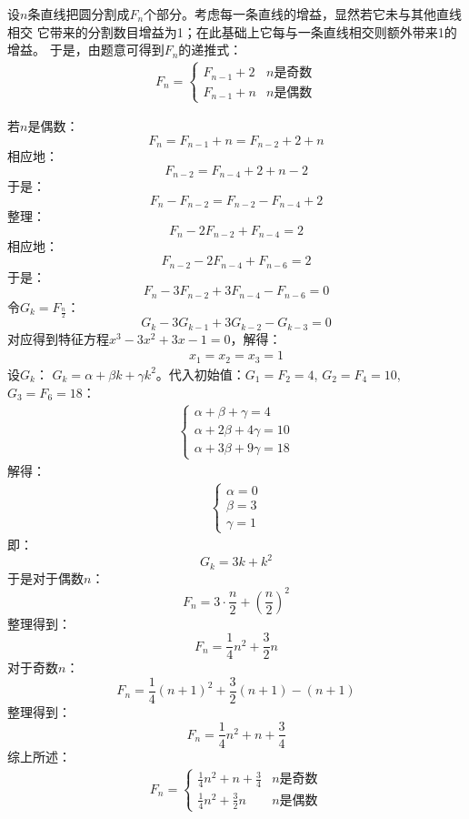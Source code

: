 \begin{solution}
    设$n$条直线把圆分割成$F_n$个部分。考虑每一条直线的增益，显然若它未与其他直线相交
    它带来的分割数目增益为1；在此基础上它每与一条直线相交则额外带来1的增益。
    于是，由题意可得到$F_n$的递推式：
    \begin{align*}
        F_n = 
        \begin{cases}
        F_{n-1}+2&n\text{是奇数}\\
        F_{n-1}+n&n\text{是偶数}
        \end{cases}
    \end{align*}

    若$n$是偶数：
    $$F_n=F_{n-1}+n=F_{n-2}+2+n$$
    相应地：
    $$F_{n-2}=F_{n-4}+2+n-2$$
    于是：
    $$F_n-F_{n-2}=F_{n-2}-F_{n-4}+2$$
    整理：
    $$F_n-2F_{n-2}+F_{n-4}=2$$
    相应地：
    $$F_{n-2}-2F_{n-4}+F_{n-6}=2$$
    于是：
    $$F_n-3F_{n-2}+3F_{n-4}-F_{n-6}=0$$
    令$G_k=F_\frac{n}{2}$：
    $$G_k-3G_{k-1}+3G_{k-2}-G_{k-3}=0$$
    对应得到特征方程$x^3-3x^2+3x-1=0$，解得：
    \begin{align*}
            x_1 = x_2 = x_3 = 1
    \end{align*}
    设$G_k$：
    $G_k = \alpha+ \beta k+\gamma k^2$。代入初始值：$G_1=F_2=4$,
    $G_2=F_4=10$, $G_3=F_6=18$：
    \begin{align*}
        \begin{cases}
            \alpha+ \beta + \gamma = 4\\
            \alpha+ 2\beta +4\gamma = 10\\
            \alpha+ 3\beta +9\gamma = 18
        \end{cases}
    \end{align*}
    解得：
    \begin{align*}
        \begin{cases}
            \alpha = 0\\
            \beta = 3\\
            \gamma = 1
        \end{cases}
    \end{align*}
    即：
    $$G_k = 3k+ k^2$$
    于是对于偶数$n$：
    $$F_n = 3\cdot\frac{n}{2}+ \left(\frac{n}{2}\right)^2$$
    整理得到：
    $$F_n = \frac{1}{4}n^2+\frac{3}{2}n$$
    对于奇数$n$：
    $$F_n = \frac{1}{4}(n+1)^2+\frac{3}{2}(n+1)-(n+1)$$
    整理得到：
    $$F_n = \frac{1}{4}n^2+n+\frac{3}{4}$$
    综上所述：
    \begin{align*}
        F_n = 
        \begin{cases}
            \frac{1}{4}n^2+n+\frac{3}{4}&n\text{是奇数}\\
            \frac{1}{4}n^2+\frac{3}{2}n&n\text{是偶数}
        \end{cases}
    \end{align*}
\end{solution}